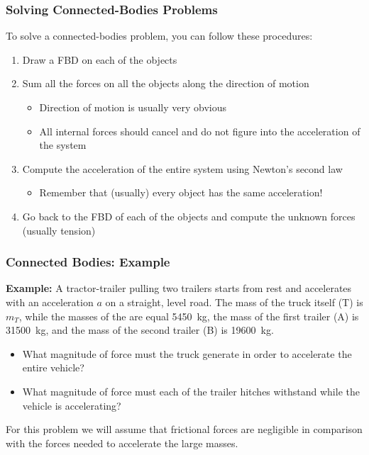 \documentclass[12pt,compress,aspectratio=169]{beamer}
\begin{document}
\begin{frame}
  \frametitle{Solving Connected-Bodies Problems}
  To solve a connected-bodies problem, you can follow these procedures:
  \begin{enumerate}
  \item Draw a FBD on each of the objects
  \item Sum all the forces on all the objects along the direction of motion
    \begin{itemize}
    \item Direction of motion is usually very obvious
    \item All internal forces should cancel and do not figure into the
      acceleration of the system
    \end{itemize}
  \item Compute the acceleration of the entire system using Newton's second law
    \begin{itemize}
    \item Remember that (usually) every object has the same acceleration!
    \end{itemize}
  \item Go back to the FBD of each of the objects and compute the unknown
    forces (usually tension)
  \end{enumerate}
\end{frame}



\begin{frame}
  \frametitle{Connected Bodies: Example}
  \textbf{Example:} A tractor-trailer pulling two trailers starts from rest
  and accelerates with an acceleration $a$ on a straight, level road.
  The mass of the truck itself (T) is $m_T$, while the masses of the are
  equal \SI{5450}{kg}, the
  mass of the first trailer (A) is \SI{31500}{kg}, and the mass of the second
  trailer (B) is \SI{19600}{kg}.
  \begin{itemize}
  \item What magnitude of force must the truck generate in order to accelerate
    the entire vehicle?
  \item What magnitude of force must each of the trailer hitches withstand
    while the vehicle is accelerating?
  \end{itemize}
  For this problem we will assume that frictional forces are negligible in
  comparison with the forces needed to accelerate the large masses.
\end{frame}
\end{document}

